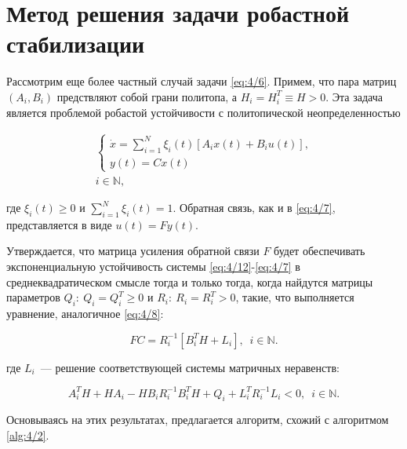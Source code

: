 


\section{Метод решения задачи робастной стабилизации}

Рассмотрим еще более частный случай задачи \vref{eq:4/6}. Примем, что пара матриц $(A_i,B_i)$ предствляют собой грани политопа, а $H_i = H_i^T \equiv H > 0$. Эта задача является проблемой робастой устойчивости с политопической неопределенностью

\begin{eqnarray}
\label{eq:4/12}
\left\{ \begin{array}{l}
\dot{x} = \sum\limits_{i=1}^N \xi_i(t)[A_ix(t) + B_iu(t)]\mbox{,} \\
y(t) = Cx(t)
\end{array} \right. \\
i \in \mathbb{N}\mbox{,} \nonumber
\end{eqnarray}

где $\xi_i(t) \geqslant 0$ и $\sum_{i=1}^N\xi_i(t)=1$. Обратная связь, как и в \vref{eq:4/7}, представляется в виде $u(t) = Fy(t)$.\br

Утверждается, что матрица усиления обратной связи $F$ будет обеспечивать экспоненциальную устойчивость системы \vref{eq:4/12}-\ref{eq:4/7} в среднеквадратическом смысле тогда и только тогда, когда найдутся матрицы параметров $Q_i\colon~Q_i = Q_i^T \geqslant 0$ и $R_i\colon~R_i = R_i^T > 0$, такие, что выполняется уравнение, аналогичное \vref{eq:4/8}:

\begin{equation}
\label{eq:4/13}
FC = R_i^{-1}[B_i^TH + L_i]\mbox{,}~~~i \in \mathbb{N}\mbox{.}
\end{equation}

где $L_i$~--- решение соответствующей системы матричных неравенств:

\begin{equation}
\label{eq:4/14}
A_i^TH + HA_i - HB_iR_i^{-1}B_i^TH + Q_i + L_i^TR_i^{-1}L_i < 0\mbox{,}~~~ i \in \mathbb{N}\mbox{.}
\end{equation}

Основываясь на этих результатах, предлагается алгоритм, схожий с алгоритмом \vref{alg:4/2}.

